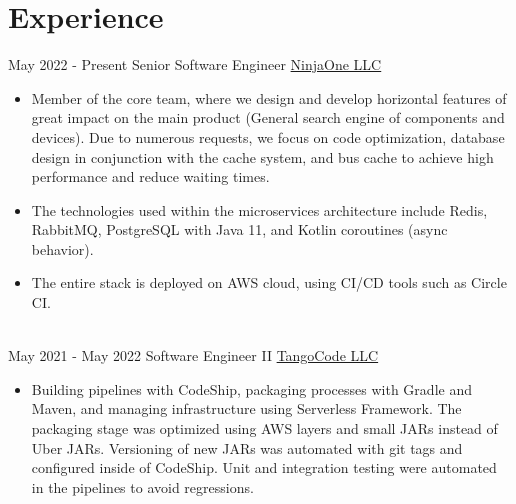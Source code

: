 \documentclass[letterpaper]{twentysecondcv} %
\begin{document}

\section{Experience}

\begin{twenty} %

\twentyitem
    {May 2022 -}
    {Present}
    {Senior Software Engineer}
    {\href{https://www.ninjaone.com/about-us/}{NinjaOne LLC}}
    {}
    {
        \begin{itemize}
            \item
            Member of the core team, where we design and develop horizontal features of great impact on the main product (General search engine of components and devices). Due to numerous requests, we focus on code optimization, database design in conjunction with the cache system, and bus cache to achieve high performance and reduce waiting times.
         \end{itemize}
         
        \begin{itemize}
            \item
            The technologies used within the microservices architecture include Redis, RabbitMQ, PostgreSQL with Java 11, and Kotlin coroutines (async behavior).
         \end{itemize}
         
         \begin{itemize}
            \item
            The entire stack is deployed on AWS cloud, using CI/CD tools such as Circle CI.
         \end{itemize}
    }
    \\

\twentyitem
    {May 2021 -}
    {May 2022}
    {Software Engineer II}
    {\href{https://tangocode.com/}{TangoCode LLC}}
    {}
    {
        \begin{itemize}
            \item Building pipelines with CodeShip, packaging processes with Gradle and Maven, and managing infrastructure using Serverless Framework. The packaging stage was optimized using AWS layers and small JARs instead of Uber JARs. Versioning of new JARs was automated with git tags and configured inside of CodeShip. Unit and integration testing were automated in the pipelines to avoid regressions.
        \end{itemize}

}
\end{twenty}
\end{document}
